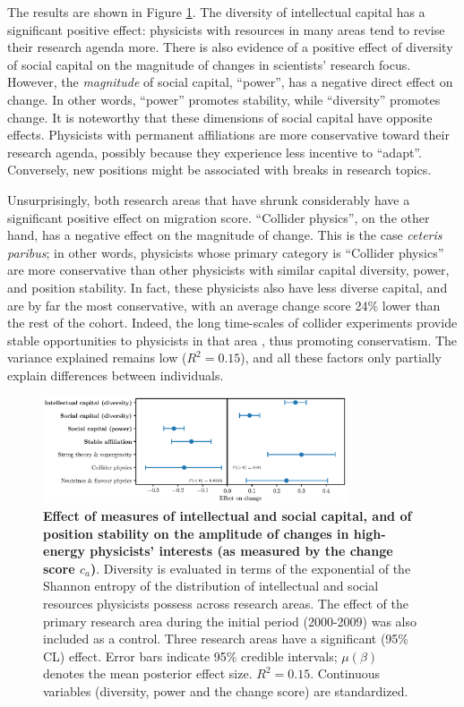 \documentclass{article}
\begin{document}
The results are shown in Figure \ref{fig:change_score_effect}. The diversity of intellectual capital has a significant positive effect: physicists with resources in many areas tend to revise their research agenda more. There is also evidence of a positive effect of diversity of social capital on the magnitude of changes in scientists' research focus. However, the \textit{magnitude} of social capital, ``power'', has a negative direct effect on change. In other words, ``power'' promotes stability, while ``diversity'' promotes change. It is noteworthy that these dimensions of social capital have opposite effects. Physicists with permanent affiliations are more conservative toward their research agenda, possibly because they experience less incentive to ``adapt''. Conversely, new positions might be associated with breaks in research topics.

Unsurprisingly, both research areas that have shrunk considerably have a significant positive effect on migration score. ``Collider physics'', on the other hand, has a negative effect on the magnitude of change. This is the case \textit{ceteris paribus}; in other words, physicists whose primary category is ``Collider physics'' are more conservative than other physicists with similar capital diversity, power, and position stability. In fact, these physicists also have less diverse capital, and are by far the most conservative, with an average change score 24\% lower than the rest of the cohort. Indeed, the long time-scales of collider experiments provide stable opportunities to physicists in that area \citep[p.~138]{galison1987how}, thus promoting conservatism. The variance explained remains low ($R^2=0.15$), and all these factors only partially explain differences between individuals.

\begin{figure}[h]
    \centering
    \includegraphics[width=0.8\textwidth]{plots/change_score_effects_entropy_magnitude.eps}
    \caption{\textbf{Effect of measures of intellectual and social capital, and of position stability on the amplitude of changes in high-energy physicists' interests (as measured by the change score $c_a$)}. Diversity is evaluated in terms of the exponential of the Shannon entropy of the distribution of intellectual and social resources physicists possess across research areas. The effect of the primary research area during the initial period (2000-2009) was also included as a control. Three research areas have a significant (95\% CL) effect. Error bars indicate 95\% credible intervals; $\mu(\beta)$ denotes the mean posterior effect size. $R^2=0.15$. Continuous variables (diversity, power and the change score) are standardized.}
    \label{fig:change_score_effect}
\end{figure}
\end{document}
